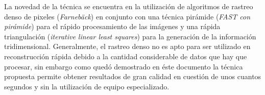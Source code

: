 La novedad de la t\'{e}cnica se encuentra en la utilizaci\'{o}n de algoritmos de rastreo denso de pixeles (\textit{Farnebäck}) en conjunto con una t\'{e}cnica pir\'{a}mide (\textit{FAST con pir\'{a}mide}) para el r\'{a}pido procesamiento de las im\'{a}genes y una r\'{a}pida triangulaci\'{o}n (\textit{iterative linear least squares}) para la generaci\'{o}n de la informaci\'{o}n tridimensional. Generalmente, el rastreo denso no es apto para ser utilizado en reconstrucci\'{o}n r\'{a}pida debido a la cantidad considerable de datos que hay que procesar, sin embargo como qued\'{o} demostrado en \'{e}ste documento la t\'{e}cnica propuesta permite obtener resultados de gran calidad en cuesti\'{o}n de unos cuantos segundos y sin la utilizaci\'{o}n de equipo especializado.


